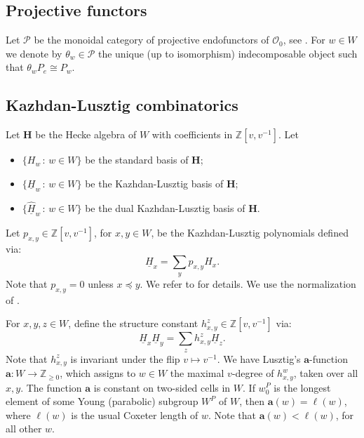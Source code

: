\documentclass[a4paper]{amsart}
\begin{document}
\subsection{Projective functors}\label{s2.2}

Let $\mathscr{P}$ be the monoidal category of projective
endofunctors of $\mathcal{O}_0$, see \cite{BG}.
For $w\in W$ we denote by $\theta_w\in \mathscr{P}$
the unique (up to isomorphism) indecomposable object
such that $\theta_w P_e\cong P_w$.


\subsection{Kazhdan-Lusztig combinatorics}\label{s2.3}

Let $\mathbf{H}$ be the Hecke algebra of $W$ with coefficients
in $%
\mathbb{Z}[v,v^{-1}]$. Let
\begin{itemize}
\item $\{H_w\,:\,w\in W\}$ be the standard basis of $\mathbf{H}$;
\item $\{\underline{H}_w\,:\,w\in W\}$ be the Kazhdan-Lusztig 
basis of $\mathbf{H}$;
\item $\{\underline{\hat{H}}_w\,:\,w\in W\}$ be the dual
Kazhdan-Lusztig  basis of $\mathbf{H}$.
\end{itemize}
Let $p_{x,y}\in \mathbb{Z}[v,v^{-1}]$,
for $x,y\in W$, be the Kazhdan-Lusztig
polynomials defined via:
\begin{displaymath}
\underline{H}_x=\sum_y  p_{x,y} H_x. 
\end{displaymath}
Note that  $p_{x,y}=0$ unless $x\preceq y$.
We refer to \cite{KL,So2} for details. We use the normalization of \cite{So2}.

For $x,y,z\in W$, define the structure constant 
$h_{x,y}^z\in \mathbb{Z}[v,v^{-1}]$ via:
\begin{displaymath}
\underline{H}_x\underline{H}_y=
\sum_{z}h_{x,y}^z\underline{H}_z.
\end{displaymath}
Note that $h_{x,y}^z$ is invariant under the flip $v\mapsto v^{-1}$.
We have Lusztig's $\mathbf{a}$-function 
$\mathbf{a}:W\to\mathbb{Z}_{\geq 0}$, which assigns to
$w\in W$ the maximal $v$-degree of $h_{x,y}^w$, taken 
over all $x,y$. The function $\mathbf{a}$ is constant on 
two-sided cells in $W$. If $w_0^P$ is the longest element of
some Young (parabolic) subgroup $W^P$ of $W$, then 
$\mathbf{a}(w)=\ell(w)$, where $\ell(w)$ is the usual 
Coxeter length of $w$. Note that $\mathbf{a}(w)<\ell(w)$,
for all other $w$.
\end{document}

